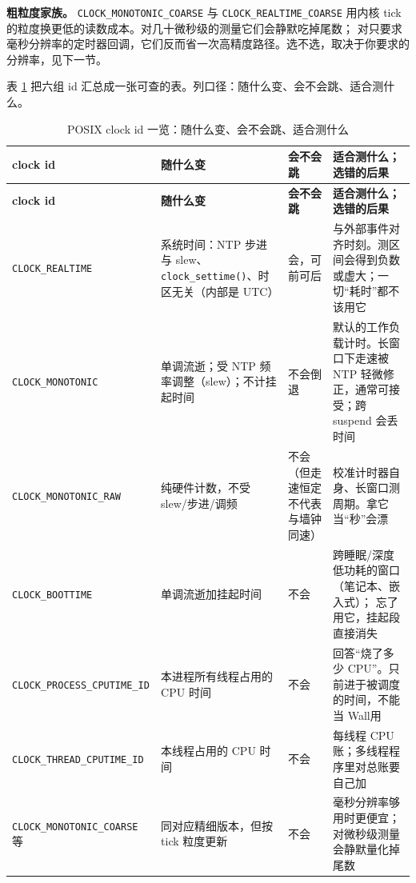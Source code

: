 \documentclass[12pt,a4paper,fontset=fandol]{ctexbook}
\newcommand{\Fn}[1]{\texttt{#1()}}
\newcommand{\Tp}[1]{\texttt{#1}}
\newcommand{\Bk}{\discretionary{}{}{}}
\newcommand{\Lang}[1]{\textsf{#1}}
\newcommand{\MWall}{\Lang{Wall}}
\begin{document}
\textbf{粗粒度家族。} \Tp{CLOCK{\Bk}\_MONOTONIC{\Bk}\_COARSE} 与 \Tp{CLOCK{\Bk}\_REALTIME{\Bk}\_COARSE}
用内核 tick 的粒度换更低的读数成本。对几十微秒级的测量它们会静默吃掉尾数；
对只要求毫秒分辨率的定时器回调，它们反而省一次高精度路径。选不选，取决于你要求的分辨率，见下一节。

表 \ref{tab:pm02-clockid} 把六组 id 汇总成一张可查的表。列口径：随什么变、会不会跳、适合测什么。

{\begin{longtable}{@{}>{\raggedright\arraybackslash}p{} >{\raggedright\arraybackslash}p{} >{\raggedright\arraybackslash}p{} >{\raggedright\arraybackslash}p{}@{}}
\caption{POSIX clock id 一览：随什么变、会不会跳、适合测什么}\label{tab:pm02-clockid}\\
\toprule
\textbf{clock id} & \textbf{随什么变} & \textbf{会不会跳} & \textbf{适合测什么；选错的后果}\\
\midrule
\endfirsthead
\toprule
\textbf{clock id} & \textbf{随什么变} & \textbf{会不会跳} & \textbf{适合测什么；选错的后果}\\
\midrule
\endhead
\midrule
\bottomrule
\endlastfoot
\Tp{CLOCK{\Bk}\_REALTIME} & 系统时间：NTP 步进与 slew、\Fn{clock{\Bk}\_settime}、时区无关（内部是 UTC） &
会，可前可后 & 与外部事件对齐时刻。测区间会得到负数或虚大；一切``耗时''都不该用它\\
\Tp{CLOCK{\Bk}\_MONOTONIC} & 单调流逝；受 NTP 频率调整（slew）；不计挂起时间 & 不会倒退 &
默认的工作负载计时。长窗口下走速被 NTP 轻微修正，通常可接受；跨 suspend 会丢时间\\
\Tp{CLOCK{\Bk}\_MONOTONIC{\Bk}\_RAW} & 纯硬件计数，不受 slew/步进/调频 & 不会（但走速恒定不代表与墙钟同速） &
校准计时器自身、长窗口测周期。拿它当``秒''会漂\\
\Tp{CLOCK{\Bk}\_BOOTTIME} & 单调流逝加挂起时间 & 不会 & 跨睡眠/深度低功耗的窗口（笔记本、嵌入式）；
忘了用它，挂起段直接消失\\
\Tp{CLOCK{\Bk}\_PROCESS{\Bk}\_CPUTIME{\Bk}\_ID} & 本进程所有线程占用的 CPU 时间 & 不会 &
回答``烧了多少 CPU''。只前进于被调度的时间，不能当 \MWall 用\\
\Tp{CLOCK{\Bk}\_THREAD{\Bk}\_CPUTIME{\Bk}\_ID} & 本线程占用的 CPU 时间 & 不会 &
每线程 CPU 账；多线程程序里对总账要自己加\\
\Tp{CLOCK{\Bk}\_MONOTONIC{\Bk}\_COARSE} 等 & 同对应精细版本，但按 tick 粒度更新 & 不会 &
毫秒分辨率够用时更便宜；对微秒级测量会静默量化掉尾数\\
\end{longtable}}
\end{document}
